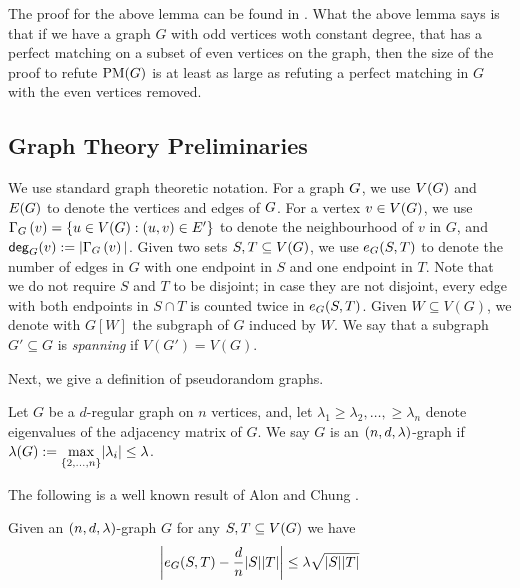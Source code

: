 \documentclass[11pt]{article}
\begin{document}
The proof for the above lemma can be found in \citep[Lemma 2.2]{Austrin_2022}.
What the above lemma says is that if we have a graph $G$ with odd vertices woth constant degree, that has a perfect matching on a subset of even vertices on the graph, then the size of the proof to refute $\PM{G}$ is at least as large as refuting a perfect matching in $G$ with the even vertices removed.


\subsection{Graph Theory Preliminaries}
\label{sec:graph-theory-prelims}

We use standard graph theoretic notation. For a graph $\Graph$, we use $\Vertices{\Graph}$ and $\Edges{\Graph}$ to denote the vertices and edges of $\Graph$. For a vertex $v \in \Vertices{\Graph}$, we use $\Neighbourhood{G}{v} = \{ u \in \Vertices{\Graph} : (u,v) \in E' \}$ to denote the neighbourhood of $v$ in $G$, and $\degree{G}{v} := |\Neighbourhood{G}{v}|$. Given two sets $S, T \subseteq \Vertices{G}$, we  use $\CutEdges{S}{T}{G}$ to denote the number of edges in $G$ with one endpoint in $S$ and one endpoint in $T$.  Note that we do not require $S$ and $T$ to be disjoint; in case they are not disjoint, every edge with both endpoints in $S \cap T$ is counted twice in $\CutEdges{S}{T}{G}$. Given $W \subseteq V(G)$, we denote with $G[W]$ the subgraph of $G$ induced by $W$. We say that a subgraph $G' \subseteq G$ is \emph{spanning} if $V(G') = V(G)$.

Next, we give a definition of pseudorandom graphs.

\begin{definition}\label{def:expander-graphs}
Let $G$ be a $d$-regular graph on $n$ vertices, and, let $\lambda_1 \geq \lambda_2, \dots, \geq \lambda_n$ denote eigenvalues of the adjacency matrix of $G$.
We say $G$ is an $\EnDeeLambda$-graph if $\ExpansionFactor{\Graph} := \underset{{\{2, \dots, n\}}}{\max}|\lambda_i| \leq \lambda$.
\end{definition}

The following is a well known result of Alon and Chung \cite{alon88mixing}.

\begin{lemma}\label{lemma:expanders-mixing-lemma}
  Given an $\EnDeeLambda$-graph $G$ for any $S, T \subseteq \Vertices{G}$ we have
$$
  \left| \CutEdges{S}{T}{G} - \frac{d}{n}|S||T| \right|
  \le \lambda\sqrt{\Size{S}\Size{T} }
$$
\end{lemma}
\end{document}
